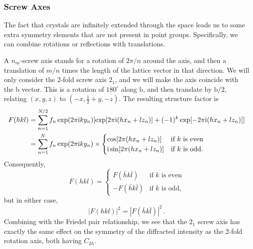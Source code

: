 \documentclass{article}
\theoremstyle{plain}\theoremheaderfont{\normalfont\itshape}\theorembodyfont{\rmfamily}\theoremseparator{.}\newtheorem*{rem}{Remark}\newtheorem*{ex}{Example}\newtheorem*{proof}{Proof}\newtheorem*{altp}{Alternative proof}
\theoremstyle{plain}\theoremheaderfont{\normalfont\bfseries}\theorembodyfont{\rmfamily}\theoremseparator{.}\newtheorem{thm}{Theorem}[section]\newtheorem{lem}[thm]{Lemma}\newtheorem{prop}[thm]{Proposition}\newtheorem*{cor}{Corollary}\newtheorem{defn}[thm]{Definition}\newtheorem{clm}[thm]{Claim}\newtheorem{clminproof}{Claim}\newtheorem*{law}{Law}\newtheorem{pos}[thm]{Postulate}
\theoremstyle{break}\theoremheaderfont{\normalfont\itshape}\theorembodyfont{\rmfamily}\theoremseparator{.\medskip}\newtheorem*{proofskip}{Proof}\newtheorem*{exs}{Examples}\newtheorem*{rems}{Remarks}
\theoremstyle{break}\theoremheaderfont{\normalfont\bfseries}\theorembodyfont{\rmfamily}\theoremseparator{.\medskip}\newtheorem{lemskip}[thm]{Lemma}\newtheorem{defnskip}[thm]{Definition}\newtheorem{propskip}[thm]{Proposition}\newtheorem{thmskip}[thm]{Theorem}
\numberwithin{equation}{section}
\newcommand{\ii}{\mathrm{i}}
\newcommand{\vb}[1]{\bm{\mathrm{#1}}}
\newcommand{\abs}[1]{\left| #1 \right|}
\begin{document}
    \subsubsection{Screw Axes}
    The fact that crystals are infinitely extended through the space leads us to some extra symmetry elements that are not present in point groups. Specifically, we can combine rotations or reflections with translations.

    A \(n_m\)-screw axis stands for a rotation of \(2\pi/n\) around the axis, and then a translation of \(m/n\) times the length of the lattice vector in that direction. We will only consider the 2-fold screw axis \(2_1\), and we will make the axis coincide with the \(\vb{b}\) vector. This is a rotation of \(180^\circ\) along \(\vb{b}\), and then translate by \(\vb{b}/2\), relating \((x,y,z)\) to \((-x,\frac{1}{2}+y,-z)\). The resulting structure factor is
    \begin{align}
        F(hkl)&=\sum_{n=1}^{N/2}f_n\exp(2\pi \ii ky_n)[\exp[2\pi \ii(hx_n+lz_n)]+(-1)^k\exp[-2\pi \ii(hx_n+lz_n)]]\notag \\
        &=\sum_{n=1}^{N}f_n\exp(2\pi \ii ky_n)\times\begin{cases}
            \cos[2\pi(hx_n+lz_n)] & \text{if \(k\) is even} \\
            \ii\sin[2\pi(hx_n+lz_n)] & \text{if \(k\) is odd.}
        \end{cases}
    \end{align}
    Consequently,
    \begin{equation}
        F(hkl)=\begin{cases}
            F(\bar{h}k\bar{l}) & \text{if \(k\) is even} \\
            -F(\bar{h}k\bar{l}) & \text{if \(k\) is odd,}
        \end{cases}
    \end{equation}
    but in either case,
    \begin{equation}
        \abs{F(hkl)}^2=\abs{F(\bar{h}k\bar{l})}^2\,.
    \end{equation}
    Combining with the Friedel pair relationship, we see that the \(2_1\) screw axis has exactly the same effect on the symmetry of the diffracted intensity as the 2-fold rotation axis, both having \(C_{2h}\).
\end{document}
